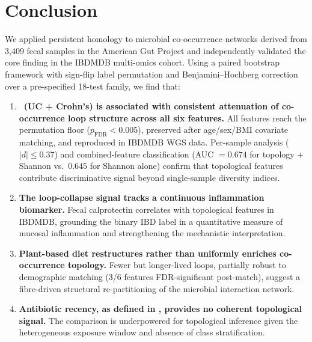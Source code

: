 \section{Conclusion}
\label{sec:conclusion}

We applied persistent homology to microbial co-occurrence networks derived
from 3,409 fecal samples in the American Gut Project and independently
validated the core finding in the IBDMDB multi-omics cohort.
Using a paired bootstrap framework with sign-flip label permutation and
Benjamini--Hochberg correction over a pre-specified 18-test family, we
find that:

\begin{enumerate}[leftmargin=*, itemsep=3pt]

  \item \textbf{\ibd\ (UC + Crohn's) is associated with consistent
  attenuation of co-occurrence loop structure across all six features.}
  All features reach the permutation floor ($p_{\text{FDR}} < 0.005$),
  preserved after age/sex/BMI covariate matching, and reproduced in
  IBDMDB WGS data.
  Per-sample analysis ($|d| \leq 0.37$) and combined-feature
  classification (AUC $= 0.674$ for topology $+$ Shannon vs.\ $0.645$
  for Shannon alone) confirm that topological features contribute
  discriminative signal beyond single-sample diversity indices.

  \item \textbf{The loop-collapse signal tracks a continuous inflammation
  biomarker.}
  Fecal calprotectin correlates with topological features in IBDMDB,
  grounding the binary IBD label in a quantitative measure of mucosal
  inflammation and strengthening the mechanistic interpretation.

  \item \textbf{Plant-based diet restructures rather than uniformly
  enriches co-occurrence topology.}
  Fewer but longer-lived loops, partially robust to demographic
  matching (3/6 features FDR-significant post-match), suggest a
  fibre-driven structural re-partitioning of the microbial interaction
  network.

  \item \textbf{Antibiotic recency, as defined in \agp, provides no
  coherent topological signal.}
  The comparison is underpowered for topological inference given the
  heterogeneous exposure window and absence of class stratification.


\end{enumerate}
